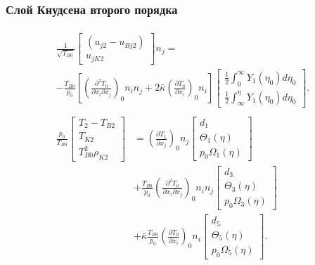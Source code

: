 \documentclass[mathserif]{beamer} %
\newcommand{\dd}{d}%
\newcommand{\pder}[2][]{\frac{\partial#1}{\partial#2}}
\newcommand{\pderder}[3][]{\frac{\partial^2#1}{\partial#2\partial#3}}
\newcommand{\onwall}[1]{\left(#1\right)_0}
\begin{document}
\begin{frame}
    \frametitle{Слой Кнудсена второго порядка}
    \footnotesize
    \begin{gather*}
        \begin{multlined}
            \frac1{\sqrt{T_{B0}}}
                \begin{bmatrix} (u_{j2} - u_{Bj2}) \\ u_{jK2} \end{bmatrix} n_j = \\
            - \frac{T_{B0}}{p_0}\left[ \onwall{\pderder[T_0]{x_i}{x_j}}n_i n_j
                + 2\bar\kappa\onwall{\pder[T_0]{x_i}}n_i \right]
                \begin{bmatrix} \frac12\int_0^\infty Y_1(\eta_0)\dd\eta_0 \\
                    \frac12\int_\infty^{\eta} Y_1(\eta_0)\dd\eta_0 \end{bmatrix}.
        \end{multlined}\label{eq:boundary_u2n}\\
        \begin{aligned}
            \frac{p_0}{T_{B0}}
                \begin{bmatrix} T_2 - T_{B2} \\ T_{K2} \\ T_{B0}^2\rho_{K2} \end{bmatrix}
            &= \onwall{\pder[T_1]{x_j}} n_j
                \begin{bmatrix} d_1 \\ \Theta_1(\eta) \\ p_0\Omega_1(\eta) \end{bmatrix} \\
            &+ \frac{T_{B0}}{p_0}\onwall{\pderder[T_0]{x_i}{x_j}} n_i n_j
                \begin{bmatrix} d_3 \\ \Theta_3(\eta) \\ p_0\Omega_3(\eta) \end{bmatrix} \\
            &+ \bar\kappa\frac{T_{B0}}{p_0}\onwall{\pder[T_0]{x_i}} n_i
                \begin{bmatrix} d_5 \\ \Theta_5(\eta) \\ p_0\Omega_5(\eta) \end{bmatrix}.
        \end{aligned}\label{eq:boundary_T2}
    \end{gather*}
\end{frame}
\end{document}
